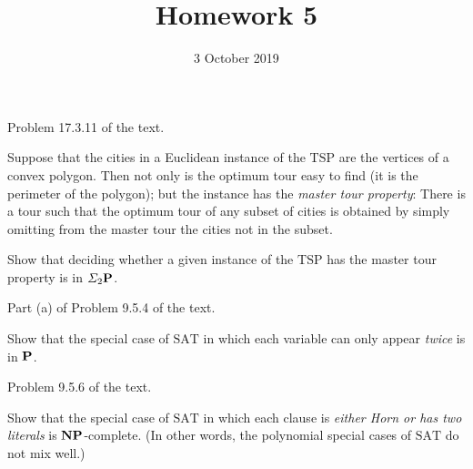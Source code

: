 \documentclass{../math167}
\title{Homework 5}
\author{}
\date{3 October 2019}
\begin{document}
\begin{problems}
\item Problem 17.3.11 of the text.
  \begin{book}
    Suppose that the cities in a Euclidean instance of the
    \(\mathrm{TSP}\) are the vertices of a convex polygon.  Then not
    only is the optimum tour easy to find (it is the perimeter of the
    polygon); but the instance has the \emph{master tour property}:
    There is a tour such that the optimum tour of any subset of cities
    is obtained by simply omitting from the master tour the cities not
    in the subset.

    Show that deciding whether a given instance of the
    \(\mathrm{TSP}\) has the master tour property is in
    \(\Sigma_2 \P\).
  \end{book}

  \begin{solution}
  \end{solution}

\item Part (a) of Problem 9.5.4 of the text.
  \begin{book}
    Show that the special case of \(\mathrm{SAT}\) in which each
    variable can only appear \emph{twice} is in \(\P\).
  \end{book}

  \begin{solution}
  \end{solution}

\item Problem 9.5.6 of the text.
  \begin{book}
    Show that the special case of \(\mathrm{SAT}\) in which each
    clause is \emph{either Horn or has two literals} is
    \(\NP\)-complete.  (In other words, the polynomial special cases
    of \(\mathrm{SAT}\) do not mix well.)
  \end{book}

  \begin{solution}
  \end{solution}

\end{problems}
\end{document}
